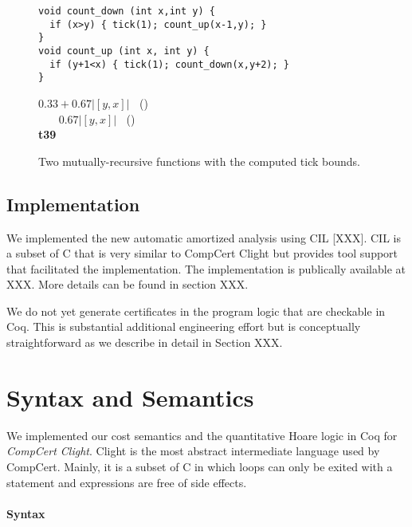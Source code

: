 \documentclass[nocopyrightspace,preprint]{sigplanconf}
\begin{document}
\begin{figure}[t]
  \centering
    \begin{minipage}[b]{\linewidth}
    \begin{center}
   \begin{lstlisting}
void count_down (int x,int y) {
  if (x>y) { tick(1); count_up(x-1,y); }
}
void count_up (int x, int y) {
  if (y+1<x) { tick(1); count_down(x,y+2); }
}
   \end{lstlisting}

$0.33 + 0.67 |[y,x]|\;\;$ ()\\
$\;\;\;\;\;\;\,0.67 |[y,x]|\;\;$ ()
\\[.7\baselineskip]
      {\bf t39}
    \end{center}
  \end{minipage}
  \caption{Two mutually-recursive functions with the computed tick bounds.}
  \label{fig:ex_rec}
\end{figure}

\subsection{Implementation}

We implemented the new automatic amortized analysis using CIL [XXX].
CIL is a subset of C that is very similar to CompCert Clight but
provides tool support that facilitated the implementation.  The
implementation is publically available at XXX.  More details can be
found in section XXX.

We do not yet generate certificates in the program logic that are
checkable in Coq.  This is substantial additional engineering effort
but is conceptually straightforward as we describe in detail in
Section XXX.


\section{Syntax and Semantics}

We implemented our cost semantics and the quantitative Hoare logic in
Coq for \emph{CompCert Clight}.  Clight is the most abstract
intermediate language used by CompCert.  Mainly, it is a subset of C
in which loops can only be exited with a  statement and
expressions are free of side effects.

\paragraph{Syntax}
\end{document}
